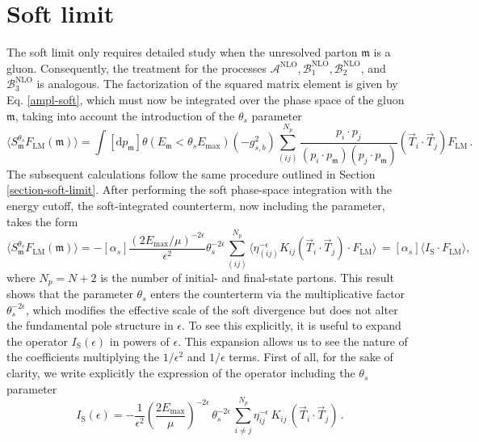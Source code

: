 \documentclass[a4paper, 12pt]{book}
\newcommand{\um}{\mathfrak{m}}
\begin{document}
\section{Soft limit}

The soft limit only requires detailed study when the unresolved parton $\um$ is a gluon. Consequently, the treatment for the processes $\mathcal{A}^{\mathrm{NLO}}, \mathcal{B}_1^{\mathrm{NLO}}, \mathcal{B}_2^{\mathrm{NLO}}$, and $\mathcal{B}_3^{\mathrm{NLO}}$  is analogous. The factorization of the squared matrix element is given by Eq. \ref{ampl-soft}, which must now be integrated over the phase space of the gluon $\um$, taking into account the introduction of the $\theta_s$ parameter
\begin{equation}
  \langle S_\um^{\theta_s} F_\mathrm{LM}(\um) \rangle = \int [\mathrm{d}p_\um] \theta(E_\um < \theta_s E_{\mathrm{max}}) (-g^2_{s,b}) \sum _{(ij)}^{N_p} \frac{p_i \cdot p_j}{(p_i \cdot p_\um)(p_j \cdot p_\um)} (\vec{T}_i \cdot \vec{T}_j) F_\mathrm{LM} \, .
\end{equation}
The subsequent calculations follow the same procedure outlined in Section \ref{section-soft-limit}. After performing the soft phase-space integration with the energy cutoff, the soft-integrated counterterm, now including the parameter, takes the form
\begin{equation}
  \langle S_\um^{\theta_s} F_\mathrm{LM}(\um) \rangle = - [\alpha_s] \frac{\left(2E_{\mathrm{max}}/\mu\right)^{-2\epsilon}}{\epsilon^2} \theta_s^{-2\epsilon}\sum_{(ij)}^{N_p} \langle \eta_{(ij)}^{-\epsilon} K_{ij} (\vec{T}_i \cdot \vec{T}_j) \cdot F_\mathrm{LM} \rangle \, = [\alpha_s] \langle I_{\mathrm{S}}\cdot F_{\mathrm{LM}} \rangle ,
\end{equation}
where $N_p = N+2$ is the number of initial- and final-state partons. This result shows that the parameter $\theta_s$ enters the counterterm via the multiplicative factor $\theta_s^{-2\epsilon}$, which modifies the effective scale of the soft divergence but does not alter the fundamental pole structure in $\epsilon$. To see this explicitly, it is useful to expand the operator $ I_{\mathrm{S}} (\epsilon)$ in powers of $\epsilon$. This expansion allows us to see the nature of the coefficients multiplying the $1/\epsilon^2$ and $1/\epsilon$ terms.  First of all, for the sake of clarity, we write explicitly the expression of the operator including the $\theta_s$ parameter
\begin{equation}
  I_{\mathrm{S}} (\epsilon)= -\frac{1}{\epsilon^2} \left(\frac{2E_{\mathrm{max}}}{\mu}\right)^{-2\epsilon} \, \theta_s^{-2\epsilon} \, \sum_{i \neq j }^{N_p} \eta_{ij}^{-\epsilon} \, K_{ij} \, \left( \vec{T}_i \cdot \vec{T}_j\right) \,. 
\end{equation}
\end{document}
